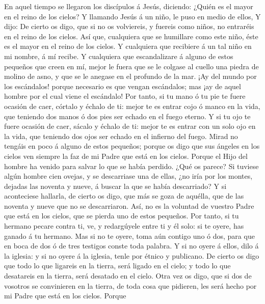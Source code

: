  En aquel tiempo se llegaron los discípulos á Jesús,
diciendo: ¿Quién es el mayor en el reino de los cielos?  Y
llamando Jesús á un niño, le puso en medio de ellos,  Y
dijo: De cierto os digo, que si no os volviereis, y fuereis como niños,
no entraréis en el reino de los cielos.  Así que, cualquiera
que se humillare como este niño, éste es el mayor en el reino de los
cielos.  Y cualquiera que recibiere á un tal niño en mi
nombre, á mí recibe.  Y cualquiera que escandalizare á
alguno de estos pequeños que creen en mí, mejor le fuera que se le
colgase al cuello una piedra de molino de asno, y que se le anegase en
el profundo de la mar.  ¡Ay del mundo por los escándalos!
porque necesario es que vengan escándalos; mas ¡ay de aquel hombre por
el cual viene el escándalo!  Por tanto, si tu mano ó tu pie
te fuere ocasión de caer, córtalo y échalo de ti: mejor te es entrar
cojo ó manco en la vida, que teniendo dos manos ó dos pies ser echado en
el fuego eterno.  Y si tu ojo te fuere ocasión de caer,
sácalo y échalo de ti: mejor te es entrar con un solo ojo en la vida,
que teniendo dos ojos ser echado en el infierno del fuego. 
Mirad no tengáis en poco á alguno de estos pequeños; porque os digo que
sus ángeles en los cielos ven siempre la faz de mi Padre que está en los
cielos.  Porque el Hijo del hombre ha venido para salvar lo
que se había perdido.  ¿Qué os parece? Si tuviese algún
hombre cien ovejas, y se descarriase una de ellas, ¿no iría por los
montes, dejadas las noventa y nueve, á buscar la que se había
descarriado?  Y si aconteciese hallarla, de cierto os digo,
que más se goza de aquélla, que de las noventa y nueve que no se
descarriaron.  Así, no es la voluntad de vuestro Padre que
está en los cielos, que se pierda uno de estos pequeños. 
Por tanto, si tu hermano pecare contra ti, ve, y redargúyele entre ti y
él solo: si te oyere, has ganado á tu hermano.  Mas si no
te oyere, toma aún contigo uno ó dos, para que en boca de dos ó de tres
testigos conste toda palabra.  Y si no oyere á ellos, dilo
á la iglesia: y si no oyere á la iglesia, tenle por étnico y publicano.
 De cierto os digo que todo lo que ligareis en la tierra,
será ligado en el cielo; y todo lo que desatareis en la tierra, será
desatado en el cielo.  Otra vez os digo, que si dos de
vosotros se convinieren en la tierra, de toda cosa que pidieren, les
será hecho por mi Padre que está en los cielos.  Porque
